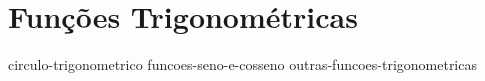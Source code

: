 \section{Funções Trigonométricas}

{circulo-trigonometrico}
{funcoes-seno-e-cosseno}
{outras-funcoes-trigonometricas}